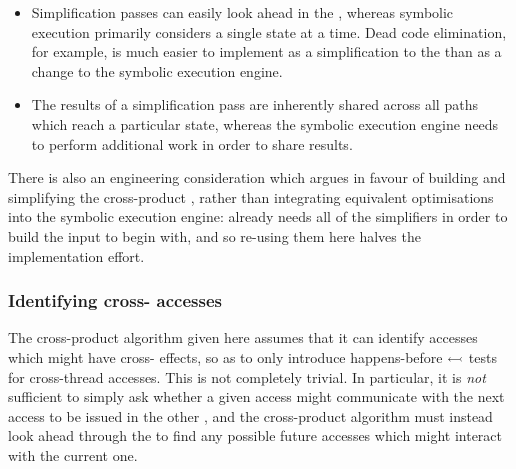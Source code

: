 \begin{itemize}
\item Simplification passes can easily look ahead in the
  {\StateMachine}, whereas symbolic execution primarily considers a
  single state at a time.  Dead code elimination, for example, is much
  easier to implement as a simplification to the {\StateMachine}
  than as a change to the symbolic execution engine.
\item The results of a simplification pass are inherently shared
  across all paths which reach a particular state, whereas the
  symbolic execution engine needs to perform additional work in
  order to share results.
\end{itemize}

There is also an engineering consideration which argues in favour of
building and simplifying the cross-product {\StateMachine}, rather
than integrating equivalent optimisations into the symbolic execution
engine: {\technique} already needs all of the simplifiers in order to
build the input {\StateMachines} to begin with, and so re-using them
here halves the implementation effort.

\subsubsection{Identifying cross-{\StateMachine} accesses}

The cross-product algorithm given here assumes that it can identify
accesses which might have cross-{\StateMachine} effects, so as to only
introduce happens-before $\leftarrowtail$ tests for cross-thread
accesses.  This is not completely trivial.  In particular, it is
\emph{not} sufficient to simply ask whether a given access might
communicate with the next access to be issued in the other
{\StateMachine}, and the cross-product algorithm must instead look
ahead through the {\StateMachines} to find any possible future
accesses which might interact with the current one.

